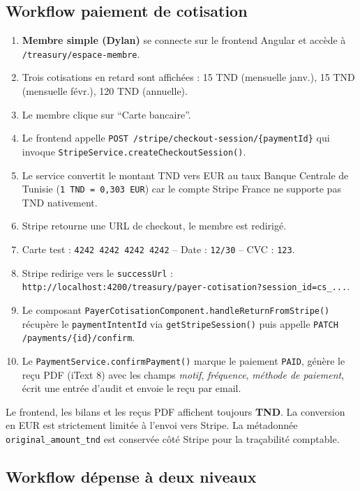 \documentclass[11pt,a4paper]{article}
\begin{document}
\subsection{Workflow paiement de cotisation}

\begin{enumerate}[leftmargin=*]
  \item \textbf{Membre simple (Dylan)} se connecte sur le frontend Angular et accède à \texttt{/treasury/espace-membre}.
  \item Trois cotisations en retard sont affichées : 15 TND (mensuelle janv.), 15 TND (mensuelle févr.), 120 TND (annuelle).
  \item Le membre clique sur ``Carte bancaire''.
  \item Le frontend appelle \texttt{POST /stripe/checkout-session/\{paymentId\}} qui invoque \texttt{StripeService.createCheckoutSession()}.
  \item Le service convertit le montant TND vers EUR au taux Banque Centrale de Tunisie (\texttt{1 TND = 0,303 EUR}) car le compte Stripe France ne supporte pas TND nativement.
  \item Stripe retourne une URL de checkout, le membre est redirigé.
  \item Carte test : \texttt{4242 4242 4242 4242} -- Date : \texttt{12/30} -- CVC : \texttt{123}.
  \item Stripe redirige vers le \texttt{successUrl} : \texttt{http://localhost:4200/treasury/payer-cotisation?session\_id=cs\_...}.
  \item Le composant \texttt{PayerCotisationComponent.handleReturnFromStripe()} récupère le \texttt{paymentIntentId} via \texttt{getStripeSession()} puis appelle \texttt{PATCH /payments/\{id\}/confirm}.
  \item Le \texttt{PaymentService.confirmPayment()} marque le paiement \texttt{PAID}, génère le reçu PDF (iText 8) avec les champs \emph{motif}, \emph{fréquence}, \emph{méthode de paiement}, écrit une entrée d'audit et envoie le reçu par email.
\end{enumerate}

\begin{successbox}
  Le frontend, les bilans et les reçus PDF affichent toujours \textbf{TND}. La conversion en EUR est strictement limitée à l'envoi vers Stripe. La métadonnée \texttt{original\_amount\_tnd} est conservée côté Stripe pour la traçabilité comptable.
\end{successbox}

\subsection{Workflow dépense à deux niveaux}
\end{document}
